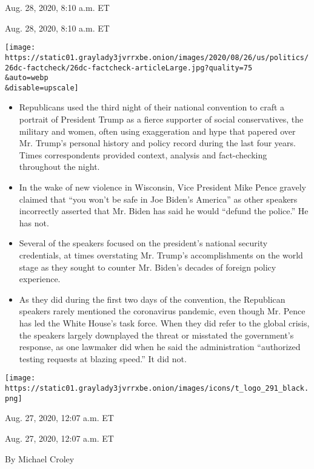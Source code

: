 Aug. 28, 2020, 8:10 a.m. ET

Aug. 28, 2020, 8:10 a.m. ET

\texttt{[image: https://static01.graylady3jvrrxbe.onion/images/2020/08/26/us/politics/26dc-factcheck/26dc-factcheck-articleLarge.jpg?quality=75\\\&auto=webp\\\&disable=upscale]}

\begin{itemize}
\tightlist
\item
  Republicans used the third night of their national convention to craft
  a portrait of President Trump as a fierce supporter of social
  conservatives, the military and women, often using exaggeration and
  hype that papered over Mr. Trump's personal history and policy record
  during the last four years. Times correspondents provided context,
  analysis and fact-checking throughout the night.
\end{itemize}

\begin{itemize}
\item
  In the wake of new violence in Wisconsin, Vice President Mike Pence
  gravely claimed that ``you won't be safe in Joe Biden's America'' as
  other speakers incorrectly asserted that Mr. Biden has said he would
  ``defund the police.'' He has not.
\item
  Several of the speakers focused on the president's national security
  credentials, at times overstating Mr. Trump's accomplishments on the
  world stage as they sought to counter Mr. Biden's decades of foreign
  policy experience.
\item
  As they did during the first two days of the convention, the
  Republican speakers rarely mentioned the coronavirus pandemic, even
  though Mr. Pence has led the White House's task force. When they did
  refer to the global crisis, the speakers largely downplayed the threat
  or misstated the government's response, as one lawmaker did when he
  said the administration ``authorized testing requests at blazing
  speed.'' It did not.
\end{itemize}

\texttt{[image: https://static01.graylady3jvrrxbe.onion/images/icons/t\_logo\_291\_black.png]}

Aug. 27, 2020, 12:07 a.m. ET

Aug. 27, 2020, 12:07 a.m. ET

By Michael Croley

